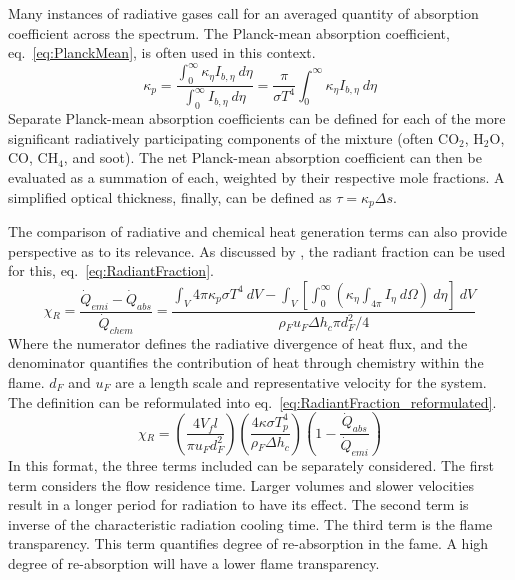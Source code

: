 
Many instances of radiative gases call for an averaged quantity of absorption coefficient across the spectrum. The Planck-mean absorption coefficient, eq.~\ref{eq:PlanckMean}, is often used in this context.
\begin{equation}
    \kappa{}_p = \frac{\int^\infty_0{\kappa{}_\eta{}I_{b,\eta}~d\eta}}{\int^\infty_0{I_{b,\eta}~d\eta}}=\frac{\pi}{\sigma{}T^4}\int^\infty_0{\kappa{}_\eta{}I_{b,\eta}~d\eta}
    \label{eq:PlanckMean}
\end{equation}
Separate Planck-mean absorption coefficients can be defined for each of the more significant radiatively participating components of the mixture (often CO$_2$, H$_2$O, CO, CH$_4$, and soot). The net Planck-mean absorption coefficient can then be evaluated as a summation of each, weighted by their respective mole fractions.
A simplified optical thickness, finally, can be defined as $\tau{}=\kappa{}_p\Delta{s}$.

The comparison of radiative and chemical heat generation terms can also provide perspective as to its relevance. As discussed by \citet{Liu2020TheFlames}, the radiant fraction can be used for this, eq.~\ref{eq:RadiantFraction}.
\begin{equation}
    \chi{}_R=\frac{\dot{Q}_{emi}-\dot{Q}_{abs}}{\dot{Q}_{chem}}=\frac{\int_V{4\pi{}\kappa{}_p\sigma{}T^4~dV}-\int_V\left[\int_0^\infty{\left(\kappa{}_\eta{}\int_{4\pi}I_\eta{}~d\Omega\right)~d\eta{}}\right]~dV}{\rho{}_Fu_F\Delta{h}_c\pi{}d_F^2/4}
    \label{eq:RadiantFraction}
\end{equation}
Where the numerator defines the radiative divergence of heat flux, and the denominator quantifies the contribution of heat through chemistry within the flame. $d_F$ and $u_F$ are a length scale and representative velocity for the system.
The definition can be reformulated into eq.~\ref{eq:RadiantFraction_reformulated}.
\begin{equation}
    \chi{}_R=\left(\frac{4V_fl}{\pi{}u_Fd_F^2}\right)\left(\frac{4\kappa{}\sigma{}T_p^4}{\rho{}_F\Delta{h}_c}\right)\left(1-\frac{\dot{Q}_{abs}}{\dot{Q}_{emi}}\right)
    \label{eq:RadiantFraction_reformulated}
\end{equation}
In this format, the three terms included can be separately considered. The first term considers the flow residence time. Larger volumes and slower velocities result in a longer period for radiation to have its effect.
The second term is inverse of the characteristic radiation cooling time. 
The third term is the flame transparency. This term quantifies degree of re-absorption in the fame. A high degree of re-absorption will have a lower flame transparency. 

